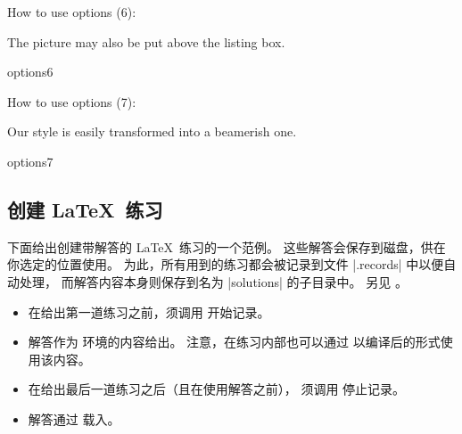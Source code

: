 \begin{dispExample}
\begin{texexptitled}
  {How to use options (6):\par The picture may also be put above
    the listing box.}{options6}
\end{texexptitled}
\end{dispExample}


\begin{dispExample}
\begin{texexptitled}[beamer,center lower,text outside listing,lefthand width=3.5cm]
  {How to use options (7):\par Our style is easily transformed into
    a beamerish one.}{options7}
\end{texexptitled}
\end{dispExample}


\clearpage
\subsection{创建 \LaTeX\ 练习}\label{listing:exercises}
下面给出创建带解答的 \LaTeX\ 练习的一个范例。
这些解答会保存到磁盘，供在你选定的位置使用。
为此，所有用到的练习都会被记录到文件 |\jobname.records| 中以便自动处理，
而解答内容本身则保存到名为 |solutions| 的子目录中。
另见 。

\begin{itemize}
\item 在给出第一道练习之前，须调用  开始记录。
\item 解答作为  环境的内容给出。
  注意，在练习内部也可以通过 
  以编译后的形式使用该内容。
\item 在给出最后一道练习之后（且在使用解答之前），
  须调用  停止记录。
\item 解答通过  载入。
\end{itemize}

